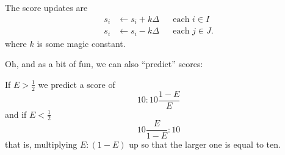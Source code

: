 \documentclass{article}
\begin{document}
The score updates are
\begin{align*}
    s_i &\leftarrow s_i + k \Delta && \text{each } i \in I \\
    s_i &\leftarrow s_i - k \Delta && \text{each } j \in J
    \text{.}
\end{align*}
where $k$ is some magic constant.


Oh, and as a bit of fun, we can also ``predict'' scores:

If $E > \frac{1}{2}$ we predict a score of
\[
    10 : 10 \frac{1 - E}{E}
\]
and if $E < \frac{1}{2}$
\[
    10 \frac{E}{1 - E} : 10
\]
that is, multiplying $E : (1 - E)$ up so that the larger one is equal to ten.
\end{document}
